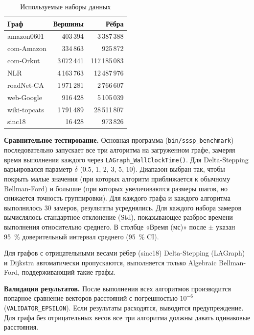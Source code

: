 \documentclass[a4paper]{article}
\begin{document}
\begin{table}[h!]
    \centering
    \caption{Используемые наборы данных}
    \label{tab:datasets}
    \begin{tabular}{lrr}
        \toprule
        \textbf{Граф} & \textbf{Вершины} & \textbf{Рёбра} \\
        \midrule
        amazon0601   & 403\,394  & 3\,387\,388  \\
        com-Amazon   & 334\,863  &   925\,872  \\
        com-Orkut    & 3\,072\,441 & 117\,185\,083 \\
        NLR          & 4\,163\,763 & 12\,487\,976 \\
        roadNet-CA   & 1\,971\,281 & 2\,766\,607  \\
        web-Google   & 916\,428  & 5\,105\,039  \\
        wiki-topcats & 1\,791\,489 & 28\,511\,807 \\
        sinc18       & 16\,428   & 973\,826     \\
        \bottomrule
    \end{tabular}
\end{table}

\textbf{Сравнительное тестирование.} Основная программа (\texttt{bin/sssp\_benchmark}) последовательно
запускает все три алгоритма на загруженном графе, замеряя время выполнения каждого
через \texttt{LAGraph\_WallClockTime()}. Для Delta-Stepping варьировался параметр $\delta$
(0.5, 1, 2, 3, 5, 10). Диапазон выбран так, чтобы покрыть малые значения
(при которых алгоритм приближается к обычному Bellman-Ford) и большие
(при которых увеличиваются размеры шагов, но снижается точность группировки).
Для каждого графа и каждого алгоритма выполнялось 30 замеров, результаты
усреднялись. Для каждого набора замеров вычислялось стандартное отклонение
(Std), показывающее разброс времени выполнения относительно среднего.
В столбце «Время (мс)» после $\pm$ указан 95~\% доверительный интервал
среднего (95~\% CI).

Для графов с отрицательными весами рёбер (sinc18) Delta-Stepping (LAGraph) и Dijkstra
автоматически пропускаются, выполняется только Algebraic Bellman-Ford,
поддерживающий такие графы.

\textbf{Валидация результатов.} После выполнения всех алгоритмов производится
попарное сравнение векторов расстояний с погрешностью $10^{-6}$
(\texttt{VALIDATOR\_EPSILON}). Если результаты расходятся, выводится
предупреждение. Для графа без отрицательных весов все три алгоритма должны
давать одинаковые расстояния.
\end{document}
